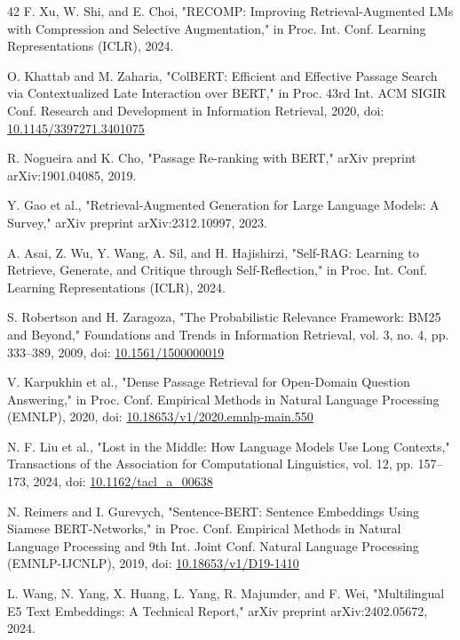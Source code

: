 \documentclass[pdflatex,sn-basic,Numbered]{sn-jnl}
\begin{document}
\begin{thebibliography}{42}
 F. Xu, W. Shi, and E. Choi, "RECOMP: Improving Retrieval-Augmented LMs with Compression and Selective Augmentation," in Proc. Int. Conf. Learning Representations (ICLR), 2024.

 O. Khattab and M. Zaharia, "ColBERT: Efficient and Effective Passage Search via Contextualized Late Interaction over BERT," in Proc. 43rd Int. ACM SIGIR Conf. Research and Development in Information Retrieval, 2020, doi: \href{https://doi.org/10.1145/3397271.3401075}{10.1145/3397271.3401075}

 R. Nogueira and K. Cho, "Passage Re-ranking with BERT," arXiv preprint arXiv:1901.04085, 2019.

 Y. Gao et al., "Retrieval-Augmented Generation for Large Language Models: A Survey," arXiv preprint arXiv:2312.10997, 2023.

 A. Asai, Z. Wu, Y. Wang, A. Sil, and H. Hajishirzi, "Self-RAG: Learning to Retrieve, Generate, and Critique through Self-Reflection," in Proc. Int. Conf. Learning Representations (ICLR), 2024.

 S. Robertson and H. Zaragoza, "The Probabilistic Relevance Framework: BM25 and Beyond," Foundations and Trends in Information Retrieval, vol. 3, no. 4, pp. 333--389, 2009, doi: \href{https://doi.org/10.1561/1500000019}{10.1561/1500000019}

 V. Karpukhin et al., "Dense Passage Retrieval for Open-Domain Question Answering," in Proc. Conf. Empirical Methods in Natural Language Processing (EMNLP), 2020, doi: \href{https://doi.org/10.18653/v1/2020.emnlp-main.550}{10.18653/v1/2020.emnlp-main.550}

 N. F. Liu et al., "Lost in the Middle: How Language Models Use Long Contexts," Transactions of the Association for Computational Linguistics, vol. 12, pp. 157--173, 2024, doi: \href{https://doi.org/10.1162/tacl\_a\_00638}{10.1162/tacl\_a\_00638}

 N. Reimers and I. Gurevych, "Sentence-BERT: Sentence Embeddings Using Siamese BERT-Networks," in Proc. Conf. Empirical Methods in Natural Language Processing and 9th Int. Joint Conf. Natural Language Processing (EMNLP-IJCNLP), 2019, doi: \href{https://doi.org/10.18653/v1/D19-1410}{10.18653/v1/D19-1410}

 L. Wang, N. Yang, X. Huang, L. Yang, R. Majumder, and F. Wei, "Multilingual E5 Text Embeddings: A Technical Report," arXiv preprint arXiv:2402.05672, 2024.


\end{thebibliography}
\end{document}
